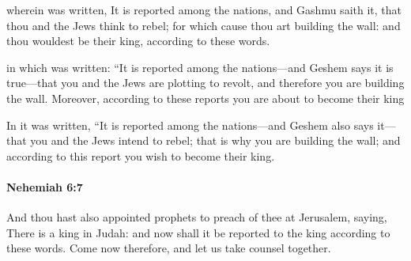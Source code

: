			\begin{versebox}
					\item[BHS] 
					\item[LXX] 
					\item[ASV] wherein was written, It is reported among the nations, and Gashmu saith it, that thou and the Jews think to rebel; for which cause thou art building the wall: and thou wouldest be their king, according to these words.
					\item[NIV] in which was written: “It is reported among the nations—and Geshem says it is true—that you and the Jews are plotting to revolt, and therefore you are building the wall. Moreover, according to these reports you are about to become their king
					\item[NRSV] In it was written, “It is reported among the nations—and Geshem also says it—that you and the Jews intend to rebel; that is why you are building the wall; and according to this report you wish to become their king.
			\end{versebox}

		\paragraph{Nehemiah 6:7} %
			\label{NEHEMIAH-6-7}

			And thou hast also appointed prophets to preach of thee at Jerusalem, saying, There is a king in Judah: and now shall it be reported to the king according to these words. Come now therefore, and let us take counsel together.

